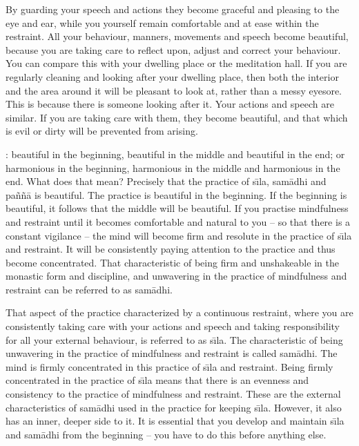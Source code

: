 By guarding your speech and actions they become graceful and pleasing to the eye and ear, while you yourself remain comfortable and at ease within the restraint. All your behaviour, manners, movements and speech become beautiful, because you are taking care to reflect upon, adjust and correct your behaviour. You can compare this with your dwelling place or the meditation hall. If you are regularly cleaning and looking after your dwelling place, then both the interior and the area around it will be pleasant to look at, rather than a messy eyesore. This is because there is someone looking after it. Your actions and speech are similar. If you are taking care with them, they become beautiful, and that which is evil or dirty will be prevented from arising.

: beautiful in the beginning, beautiful in the middle and beautiful in the end; or harmonious in the beginning, harmonious in the middle and harmonious in the end. What does that mean? Precisely that the practice of s\={\i}la, sam\=adhi and pa\~n\~n\=a is beautiful. The practice is beautiful in the beginning. If the beginning is beautiful, it follows that the middle will be beautiful. If you practise mindfulness and restraint until it becomes comfortable and natural to you -- so that there is a constant vigilance -- the mind will become firm and resolute in the practice of s\={\i}la and restraint. It will be consistently paying attention to the practice and thus become concentrated. That characteristic of being firm and unshakeable in the monastic form and discipline, and unwavering in the practice of mindfulness and restraint can be referred to as sam\=adhi.

That aspect of the practice characterized by a continuous restraint, where you are consistently taking care with your actions and speech and taking responsibility for all your external behaviour, is referred to as s\={\i}la. The characteristic of being unwavering in the practice of mindfulness and restraint is called sam\=adhi. The mind is firmly concentrated in this practice of s\={\i}la and restraint. Being firmly concentrated in the practice of s\={\i}la means that there is an evenness and consistency to the practice of mindfulness and restraint. These are the external characteristics of sam\=adhi used in the practice for keeping s\={\i}la. However, it also has an inner, deeper side to it. It is essential that you develop and maintain s\={\i}la and sam\=adhi from the beginning -- you have to do this before anything else.

